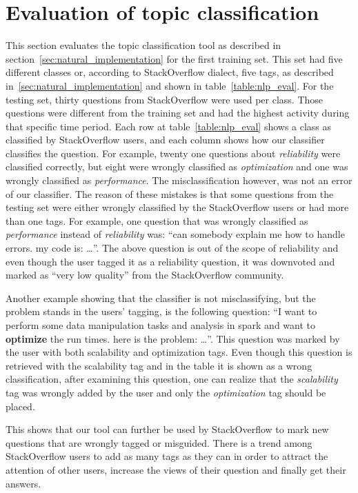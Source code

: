 \section{Evaluation of topic classification}
\label{sec:nlp_evaluation}
This section evaluates the topic classification tool as described in section~\ref{sec:natural_implementation} for the first training set. This set had five different classes or, according to StackOverflow dialect, five tags, as described in~\ref{sec:natural_implementation} and shown in table~\ref{table:nlp_eval}. For the testing set, thirty questions from StackOverflow were used per class. Those questions were different from the training set and had the highest activity during that specific time period. Each row at table~\ref{table:nlp_eval} shows a class as classified by StackOverflow users, and each column shows how our classifier classifies the question. For example, twenty one questions about \emph{reliability} were classified correctly, but eight were wrongly classified as \emph{optimization} and one was wrongly classified as \emph{performance}. The misclassification however, was not an error of our classifier. The reason of these mistakes is that  some questions from the testing set were either wrongly classified by the StackOverflow users or had more than one tags. For example, one question that was wrongly classified as \emph{performance} instead of \emph{reliability} was: ``can somebody explain me how to handle errors. my code is: \ldots''. The above question is out of the scope of reliability and even though the user tagged it as a reliability question, it was downvoted and marked as ``very low quality'' from the StackOverflow community.

Another example showing that the classifier is not misclassifying, but the problem stands in the users' tagging, is the following question:
``I want to perform some data manipulation tasks and analysis in spark and want to \textbf{optimize} the run times. 
here is the problem: \ldots ''. 
This question was marked by the user with both scalability and optimization tags. Even though this question is retrieved with the scalability tag and in the table it is shown as a wrong classification, after examining this question, one can realize that the \emph{scalability} tag was wrongly added by the user and only the \emph{optimization} tag should be placed.

This shows that our tool can further be used by StackOverflow to mark new questions that are wrongly tagged or misguided. There is a trend among StackOverflow users to add as many tags as they can in order to attract the attention of other users, increase the views of their question and finally get their answers.  


